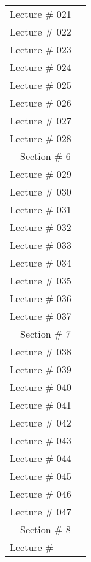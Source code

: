 \begin{center}
\begin{longtable}{ | p{5cm} | p{8cm} | }
        Lecture \# 021 &  \\
        Lecture \# 022 &  \\
        Lecture \# 023 &  \\
        Lecture \# 024 &  \\
        Lecture \# 025 &  \\
        Lecture \# 026 &  \\
        Lecture \# 027 &  \\
        Lecture \# 028 &  \\
        \hline
        \multicolumn{2}{|c|}{Section \# 6} \\ 
        \hline
        Lecture \# 029 &  \\
        Lecture \# 030 &  \\
        Lecture \# 031 &  \\
        Lecture \# 032 &  \\
        Lecture \# 033 &  \\
        Lecture \# 034 &  \\
        Lecture \# 035 &  \\
        Lecture \# 036 &  \\
        Lecture \# 037 &  \\
        \hline
        \multicolumn{2}{|c|}{Section \# 7} \\ 
        \hline
        Lecture \# 038 &  \\
        Lecture \# 039 &  \\
        Lecture \# 040 &  \\
        Lecture \# 041 &  \\
        Lecture \# 042 &  \\
        Lecture \# 043 &  \\
        Lecture \# 044 &  \\
        Lecture \# 045 &  \\
        Lecture \# 046 &  \\
        Lecture \# 047 &  \\
        \hline
        \multicolumn{2}{|c|}{Section \# 8} \\ 
        \hline
        Lecture \# &  \\
        \hline

\end{longtable}
\end{center}
